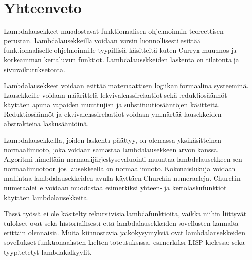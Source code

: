 \section{Yhteenveto}

Lambdalausekkeet muodostavat funktionaalisen ohjelmoinnin teoreettisen perustan. Lambdalausekkeilla voidaan varsin luonnollisesti esittää funktionaaliselle ohjelmoinnille tyypillisiä käsitteitä kuten Curryn-muunnos ja korkeamman kertaluvun funktiot. Lambdalausekkeiden laskenta on tilatonta ja sivuvaikutuksetonta. 

\par

Lambdalausekkeet voidaan esittää matemaattisen logiikan formaalina systeeminä. Lausekkeille voidaan määrittelä lekvivalenssirelaatiot sekä reduktiosäännöt käyttäen apuna vapaiden muuttujien ja substituutiosääntöjen käsitteitä. Reduktiosäännöt ja ekvivalenssirelaatiot voidaan ymmärtää lausekkeiden abstrakteina laskusääntöinä.

\par

Lambdalausekkeilla, joiden laskenta päättyy, on olemassa yksikäsitteinen normaalimuoto, joka voidaan samastaa lambdalausekkeen arvon kanssa. Algoritmi nimeltään normaalijärjestysevaluointi muuntaa lambdalausekkeen sen normaalimuotoon jos lausekkeella on normaalimuoto. Kokonaislukuja voidaan mallintaa lambdalausekkeiden avulla käyttäen Churchin numeraaleja. Churchin numeraaleille voidaan muodostaa esimerkiksi yhteen- ja kertolaskufunktiot käyttäen lambdalausekkeita. 

\par 

Tässä työssä ei ole käsitelty rekursiivisia lambdafunktioita, vaikka niihin liittyvät tulokset ovat sekä historiallisesti että lambdalausekkeiden sovellusten kannalta erittäin olennaisia. Muita kiinnostavia jatkokysymyksiä ovat lambdalausekkeiden sovellukset funktionaalisten kielten toteutuksissa, esimerkiksi LISP-kielessä; sekä tyypitetetyt lambdakalkyylit.
